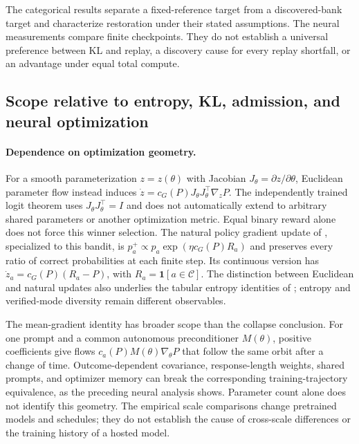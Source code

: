 \documentclass{article}
\newcommand{\1}{\mathbf 1}
\theoremstyle{remark}
\theoremstyle{definition}
\theoremstyle{plain}
\begin{document}
The categorical results separate a fixed-reference target from a
discovered-bank target and characterize restoration under their stated
assumptions. The neural measurements compare finite checkpoints. They do
not establish a universal preference between KL and replay, a discovery
cause for every replay shortfall, or an advantage under equal total compute.

\subsection{Scope relative to entropy, KL, admission, and neural optimization}
\label{app:theory-entropy}
\label{app:theory-entropy-comparison}

\paragraph{Dependence on optimization geometry.}
For a smooth parameterization $z=z(\theta)$ with Jacobian
$J_\theta=\partial z/\partial\theta$, Euclidean parameter flow instead
induces $\dot z=c_G(P)J_\theta J_\theta^\top\nabla_zP$. The independently
trained logit theorem uses $J_\theta J_\theta^\top=I$ and does not automatically
extend to arbitrary shared parameters or another optimization metric. Equal
binary reward alone does not force this winner selection. The natural policy
gradient update of \citet[Lemma~15]{agarwal2021policygradient}, specialized to
this bandit, is $p_a^+\propto p_a\exp(\eta c_G(P)R_a)$ and preserves
every ratio of correct probabilities at each finite step. Its continuous
version has $\dot z_a=c_G(P)(R_a-P)$, with
$R_a=\1[a\in\mathcal C]$. The distinction between Euclidean and natural
updates also underlies the tabular entropy identities of
\citet[Theorems~1--2]{cui2025entropy}; entropy and verified-mode diversity
remain different observables.

The mean-gradient identity has broader scope than the collapse conclusion.
For one prompt and a common autonomous preconditioner $M(\theta)$, positive
coefficients give flows $c_a(P)M(\theta)\nabla_\theta P$ that follow the same
orbit after a change of time. Outcome-dependent covariance, response-length
weights, shared prompts, and optimizer memory can break the corresponding
training-trajectory equivalence, as the preceding neural analysis shows.
Parameter count alone does not identify this geometry. The empirical scale
comparisons change pretrained models and schedules; they do not establish
the cause of cross-scale differences or the training history of a hosted
model.
\end{document}
